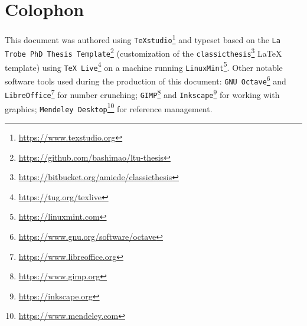 \hfill
\vfill
\section*{Colophon}


This document was authored using \texttt{TeXstudio}\footnote{\url{https://www.texstudio.org}} and typeset based on the \texttt{La Trobe PhD Thesis Template}\footnote{\url{https://github.com/bashimao/ltu-thesis}} (customization of the \texttt{classicthesis}\footnote{\url{https://bitbucket.org/amiede/classicthesis}} \LaTeX{} template) using \texttt{TeX~Live}\footnote{\url{https://tug.org/texlive}} on a machine running \texttt{LinuxMint}\footnote{\url{https://linuxmint.com}}. Other notable software tools used during the production of this document:
\texttt{GNU~Octave}\footnote{\url{https://www.gnu.org/software/octave}} and \texttt{LibreOffice}\footnote{\url{https://www.libreoffice.org}} for number crunching; \texttt{GIMP}\footnote{\url{https://www.gimp.org}} and \texttt{Inkscape}\footnote{\url{https://inkscape.org}} for working with graphics; \texttt{Mendeley Desktop}\footnote{\url{https://www.mendeley.com}} for reference management.\\

\bigskip
